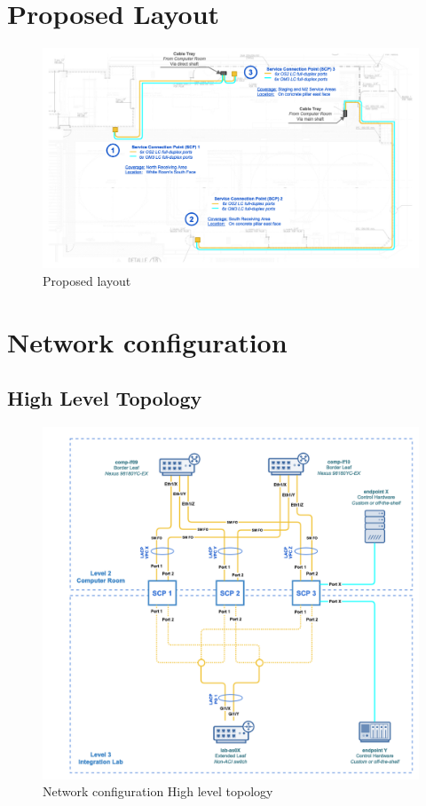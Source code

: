 \newpage
\section{Proposed Layout}

\begin{figure}
  \includegraphics[width=18cm]{images/image-001.png}
  \centering
  \caption{Proposed layout}
\end{figure}

\newpage
\section{Network configuration}
  \subsection{High Level Topology}
  \begin{figure}
    \includegraphics[width=18cm]{images/image-002.png}
    \centering
    \caption{Network configuration High level topology}
  \end{figure}

 
